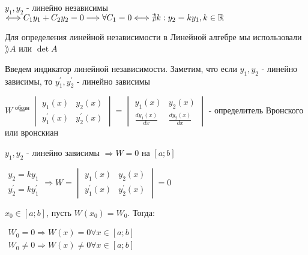 \documentclass[12pt]{article}
\begin{document}
    \Def $y_1, y_2$ - линейно независимы $\Longleftrightarrow C_1 y_1 + C_2 y_2 = 0 \Longrightarrow \forall C_1 = 0 \Longleftrightarrow \nexists k : y_2 = k y_1, k \in \mathbb{R}$

    \Mem Для определения линейной независимости в Линейной алгебре мы использовали $\rang A$ или $\det A$

    Введем индикатор линейной независимости.
    Заметим, что если $y_1, y_2$ - линейно зависимы, то $y_1^\prime, y_2^\prime$ - линейно зависимы

    \Def $W \stackrel{\text{обозн}}{=} \begin{vmatrix}y_1(x) & y_2(x) \\ y_1^\prime(x) & y_2^\prime(x)\end{vmatrix} = \begin{vmatrix}y_1(x) & y_2(x) \\ \frac{d y_1(x)}{dx} & \frac{d y_2(x)}{dx}\end{vmatrix}$ - определитель Вронского или вронскиан

    \begin{MyTheorem}
         $y_1, y_2$ - линейно зависимы $\Longrightarrow W = 0$ на $[a;b]$
    \end{MyTheorem}

    \begin{MyProof}
        $\begin{matrix}y_2 = k y_1 \\ y_2^\prime = k y_1^\prime\end{matrix} \Longrightarrow W = \begin{vmatrix}y_1(x) & y_2(x) \\ y_1^\prime(x) & y_2^\prime(x)\end{vmatrix} = 0$
    \end{MyProof}

    \begin{MyTheorem}
         $x_0 \in [a;b]$, пусть $W(x_0) = W_0$. Тогда: 
        
        $\begin{matrix}W_0 = 0 \Longrightarrow W(x) = 0 \forall x \in [a;b] \\
        W_0 \neq 0 \Longrightarrow W(x) \neq 0 \forall x \in [a;b]\end{matrix}$
    \end{MyTheorem}
\end{document}
